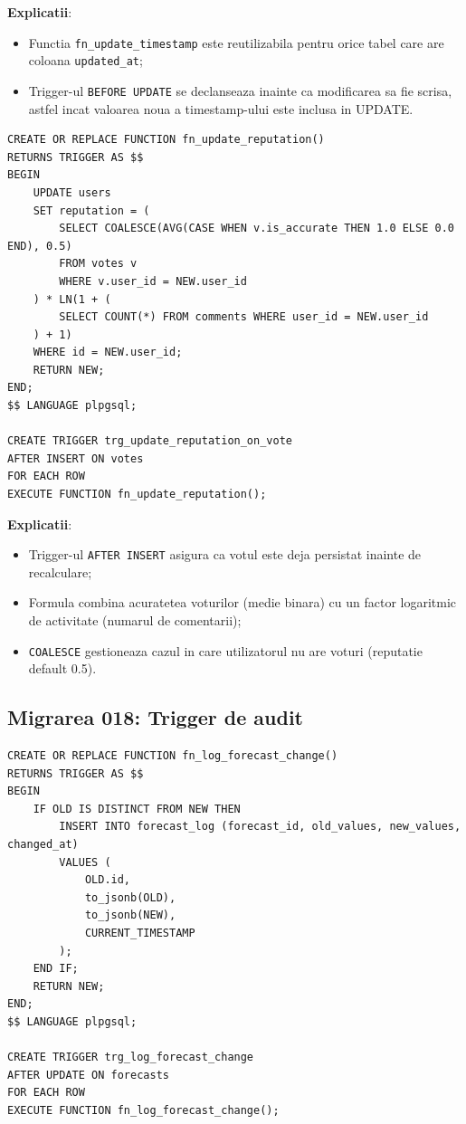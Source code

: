 \documentclass[12pt,a4paper]{article}
\begin{document}
\textbf{Explicatii}:
\begin{itemize}[noitemsep]
    \item Functia \texttt{fn\_update\_timestamp} este reutilizabila pentru orice tabel care are coloana \texttt{updated\_at};
    \item Trigger-ul \texttt{BEFORE UPDATE} se declanseaza inainte ca modificarea sa fie scrisa, astfel incat valoarea noua a timestamp-ului este inclusa in UPDATE.
\end{itemize}

\begin{lstlisting}[caption={Trigger pentru recalcularea reputatiei la vot}]
CREATE OR REPLACE FUNCTION fn_update_reputation()
RETURNS TRIGGER AS $$
BEGIN
    UPDATE users
    SET reputation = (
        SELECT COALESCE(AVG(CASE WHEN v.is_accurate THEN 1.0 ELSE 0.0 END), 0.5)
        FROM votes v
        WHERE v.user_id = NEW.user_id
    ) * LN(1 + (
        SELECT COUNT(*) FROM comments WHERE user_id = NEW.user_id
    ) + 1)
    WHERE id = NEW.user_id;
    RETURN NEW;
END;
$$ LANGUAGE plpgsql;

CREATE TRIGGER trg_update_reputation_on_vote
AFTER INSERT ON votes
FOR EACH ROW
EXECUTE FUNCTION fn_update_reputation();
\end{lstlisting}

\textbf{Explicatii}:
\begin{itemize}[noitemsep]
    \item Trigger-ul \texttt{AFTER INSERT} asigura ca votul este deja persistat inainte de recalculare;
    \item Formula combina acuratetea voturilor (medie binara) cu un factor logaritmic de activitate (numarul de comentarii);
    \item \texttt{COALESCE} gestioneaza cazul in care utilizatorul nu are voturi (reputatie default 0.5).
\end{itemize}

\subsection{Migrarea 018: Trigger de audit}

\begin{lstlisting}[caption={Trigger pentru logarea modificarilor de prognoze}]
CREATE OR REPLACE FUNCTION fn_log_forecast_change()
RETURNS TRIGGER AS $$
BEGIN
    IF OLD IS DISTINCT FROM NEW THEN
        INSERT INTO forecast_log (forecast_id, old_values, new_values, changed_at)
        VALUES (
            OLD.id,
            to_jsonb(OLD),
            to_jsonb(NEW),
            CURRENT_TIMESTAMP
        );
    END IF;
    RETURN NEW;
END;
$$ LANGUAGE plpgsql;

CREATE TRIGGER trg_log_forecast_change
AFTER UPDATE ON forecasts
FOR EACH ROW
EXECUTE FUNCTION fn_log_forecast_change();
\end{lstlisting}
\end{document}
